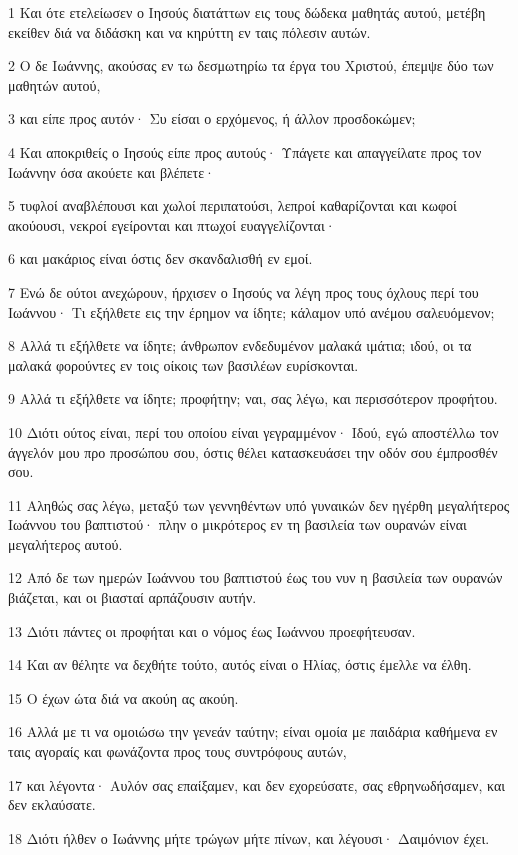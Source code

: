 \par 1 Και ότε ετελείωσεν ο Ιησούς διατάττων εις τους δώδεκα μαθητάς αυτού, μετέβη εκείθεν διά να διδάσκη και να κηρύττη εν ταις πόλεσιν αυτών.
\par 2 Ο δε Ιωάννης, ακούσας εν τω δεσμωτηρίω τα έργα του Χριστού, έπεμψε δύο των μαθητών αυτού,
\par 3 και είπε προς αυτόν· Συ είσαι ο ερχόμενος, ή άλλον προσδοκώμεν;
\par 4 Και αποκριθείς ο Ιησούς είπε προς αυτούς· Υπάγετε και απαγγείλατε προς τον Ιωάννην όσα ακούετε και βλέπετε·
\par 5 τυφλοί αναβλέπουσι και χωλοί περιπατούσι, λεπροί καθαρίζονται και κωφοί ακούουσι, νεκροί εγείρονται και πτωχοί ευαγγελίζονται·
\par 6 και μακάριος είναι όστις δεν σκανδαλισθή εν εμοί.
\par 7 Ενώ δε ούτοι ανεχώρουν, ήρχισεν ο Ιησούς να λέγη προς τους όχλους περί του Ιωάννου· Τι εξήλθετε εις την έρημον να ίδητε; κάλαμον υπό ανέμου σαλευόμενον;
\par 8 Αλλά τι εξήλθετε να ίδητε; άνθρωπον ενδεδυμένον μαλακά ιμάτια; ιδού, οι τα μαλακά φορούντες εν τοις οίκοις των βασιλέων ευρίσκονται.
\par 9 Αλλά τι εξήλθετε να ίδητε; προφήτην; ναι, σας λέγω, και περισσότερον προφήτου.
\par 10 Διότι ούτος είναι, περί του οποίου είναι γεγραμμένον· Ιδού, εγώ αποστέλλω τον άγγελόν μου προ προσώπου σου, όστις θέλει κατασκευάσει την οδόν σου έμπροσθέν σου.
\par 11 Αληθώς σας λέγω, μεταξύ των γεννηθέντων υπό γυναικών δεν ηγέρθη μεγαλήτερος Ιωάννου του βαπτιστού· πλην ο μικρότερος εν τη βασιλεία των ουρανών είναι μεγαλήτερος αυτού.
\par 12 Από δε των ημερών Ιωάννου του βαπτιστού έως του νυν η βασιλεία των ουρανών βιάζεται, και οι βιασταί αρπάζουσιν αυτήν.
\par 13 Διότι πάντες οι προφήται και ο νόμος έως Ιωάννου προεφήτευσαν.
\par 14 Και αν θέλητε να δεχθήτε τούτο, αυτός είναι ο Ηλίας, όστις έμελλε να έλθη.
\par 15 Ο έχων ώτα διά να ακούη ας ακούη.
\par 16 Αλλά με τι να ομοιώσω την γενεάν ταύτην; είναι ομοία με παιδάρια καθήμενα εν ταις αγοραίς και φωνάζοντα προς τους συντρόφους αυτών,
\par 17 και λέγοντα· Αυλόν σας επαίξαμεν, και δεν εχορεύσατε, σας εθρηνωδήσαμεν, και δεν εκλαύσατε.
\par 18 Διότι ήλθεν ο Ιωάννης μήτε τρώγων μήτε πίνων, και λέγουσι· Δαιμόνιον έχει.
